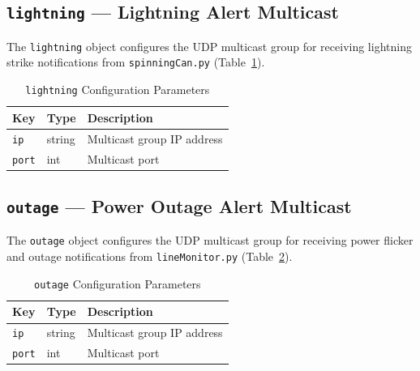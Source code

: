 \subsection{\texttt{lightning} --- Lightning Alert Multicast}

The \texttt{lightning} object configures the UDP multicast group for receiving lightning strike notifications from \texttt{spinningCan.py} (Table~\ref{tab:config-lightning}).

\begin{table}[htbp]
    \centering
    \caption{\texttt{lightning} Configuration Parameters}
    \label{tab:config-lightning}
    \begin{tabular}{llp{7cm}}
        \toprule
        \textbf{Key} & \textbf{Type} & \textbf{Description} \\
        \midrule
        \texttt{ip}   & string & Multicast group IP address \\
        \texttt{port} & int    & Multicast port \\
        \bottomrule
    \end{tabular}
\end{table}

\subsection{\texttt{outage} --- Power Outage Alert Multicast}

The \texttt{outage} object configures the UDP multicast group for receiving power flicker and outage notifications from \texttt{lineMonitor.py} (Table~\ref{tab:config-outage}).

\begin{table}[htbp]
    \centering
    \caption{\texttt{outage} Configuration Parameters}
    \label{tab:config-outage}
    \begin{tabular}{llp{7cm}}
        \toprule
        \textbf{Key} & \textbf{Type} & \textbf{Description} \\
        \midrule
        \texttt{ip}   & string & Multicast group IP address \\
        \texttt{port} & int    & Multicast port \\
        \bottomrule
    \end{tabular}
\end{table}
